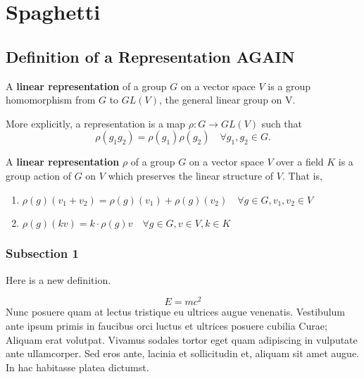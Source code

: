 
\chapter{Spaghetti} %




\section{Definition of a Representation AGAIN}

\begin{defn}A \textbf{linear representation} of a group $G$ on a vector space $V$  is a group homomorphism from $G$ to $GL(V)$, the general linear group on V. \end{defn}
 More explicitly, a representation is a map $\rho : G \rightarrow GL(V)$ such that \[ \rho (g_1 g_2) = \rho(g_1) \rho(g_2) \quad \forall g_1, g_2 \in G. \]

\begin{defn}A \textbf{linear representation} $\rho$ of a group $G$ on a vector space $V$ over a field $K$ is a group action of $G$ on $V$ which preserves the linear structure of $V$.  That is, 
\begin{enumerate}
\item  $\rho(g)(v_1+v_2)=\rho(g)(v_1)+\rho(g)(v_2) \quad  \forall g \in G, v_1, v_2 \in V$
\item $\rho(g)(kv) = k \cdot \rho(g)v \quad \forall g \in G, v \in V, k \in K$
\end{enumerate}

 \end{defn}


\subsection{Subsection 1}

\begin{defn}Here is a new definition.\end{defn}
\begin{equation} E = mc^2 \end{equation}
Nunc posuere quam at lectus tristique eu ultrices augue venenatis. Vestibulum ante ipsum primis in faucibus orci luctus et ultrices posuere cubilia Curae; Aliquam erat volutpat. Vivamus sodales tortor eget quam adipiscing in vulputate ante ullamcorper. Sed eros ante, lacinia et sollicitudin et, aliquam sit amet augue. In hac habitasse platea dictumst.

